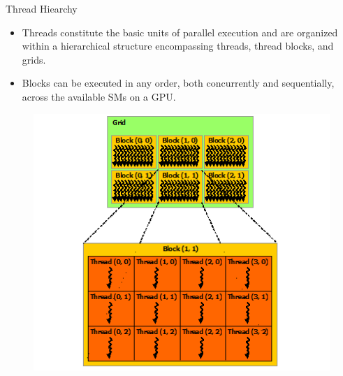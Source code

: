 \begin{frame}{Thread Hiearchy}
	\begin{block}{}
        \begin{itemize}
            \item Threads constitute the basic units of parallel execution and 
            are organized within a hierarchical structure encompassing threads, thread blocks, and grids.
            \item Blocks can be executed in any order, both concurrently and sequentially, across the available 
            SMs on a GPU.
        \end{itemize}
        \begin{center}
            \begin{figure}[H]
                \includegraphics[scale=0.65]{figures/grid-of-thread-blocks.png}
            \end{figure}
        \end{center}
    \end{block}
\end{frame}

